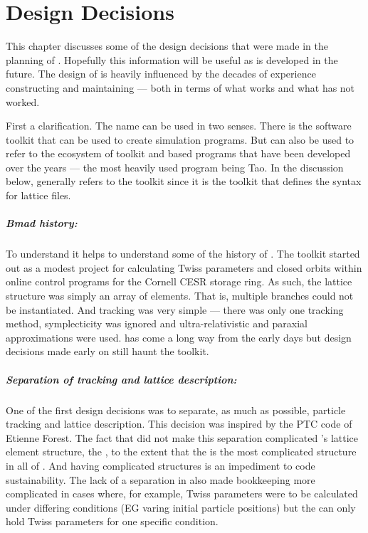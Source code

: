 \chapter{Design Decisions}
\label{c:design}

This chapter discusses some of the design decisions that were made in the planning of \accellat.
Hopefully this information will be useful as \accellat is developed in the future.
The design of \accellat is heavily influenced by the decades of experience constructing and maintaining
\bmad --- both in terms of what works and what has not worked. 

First a clarification. The name \bmad can be used in two senses. There is \bmad the software toolkit
that can be used to create simulation programs. But \bmad can also be used to refer to the 
ecosystem of toolkit and \bmad based programs that have been developed over the years --- the
most heavily used program being Tao. In the discussion below, \bmad generally refers to the toolkit
since it is the toolkit that defines the syntax for \bmad lattice files.

\paragraph{Bmad history:}
To understand \accellat it helps to understand some of the history of \bmad. The \bmad toolkit 
started out as a modest project for calculating Twiss parameters and closed orbits within online control
programs for the Cornell CESR storage ring. As such, the lattice structure was simply an array
of elements. That is, multiple branches could not be instantiated. And tracking was very simple ---
there was only one tracking method, symplecticity was ignored and ultra-relativistic and 
paraxial approximations were used. 
\bmad has come a long way from the early days but design decisions made early on still haunt the \bmad
toolkit. 

\paragraph{Separation of tracking and lattice description:} 
One of the first \accellat design decisions was to separate, as much as
possible, particle tracking and lattice description. 
This decision was inspired by the PTC code of Etienne Forest.
The fact that \bmad did not make this separation complicated \bmad's lattice element structure,
the , 
to the extent that the  is the most complicated structure in all of \bmad. And
having complicated structures is an impediment to code sustainability.
The lack of a separation in \bmad also made bookkeeping more complicated in cases where, for example, 
Twiss parameters were to be calculated under differing conditions (EG varing initial 
particle positions) but the  can only hold Twiss parameters for one specific
condition.

